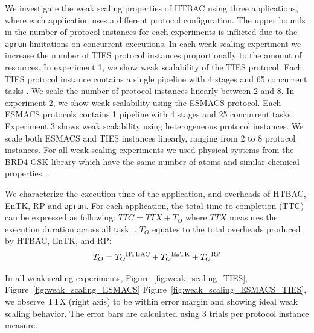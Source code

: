 We investigate the weak scaling properties of HTBAC using three applications,
where each application uses a different protocol configuration. The upper bounds
in the number of protocol instances for each experiments is inflicted due to 
the \texttt{aprun} limitations on concurrent executions. In each weak scaling 
experiment we increase the number of TIES protocol instances proportionally to 
the amount of resources. In experiment 1, we show weak scalability of the TIES 
protocol. Each TIES protocol instance contains a single pipeline with 4 stages 
and 65 concurrent tasks
 . We scale the number of protocol instances linearly 
between 2 and 8. In experiment 2, we show weak scalability using the ESMACS 
protocol. Each ESMACS protocols contains 1 pipeline with 4 stages and 25 
concurrent tasks. Experiment 3 shows weak scalability using heterogeneous 
protocol instances. We scale both ESMACS and TIES instances linearly, ranging 
from 2 to 8 protocol instances. For all weak scaling experiments we used 
physical systems from the BRD4-GSK library which have the same number of atoms
and similar chemical properties. .

We characterize the execution time of the application, and overheads of HTBAC, 
EnTK, RP and \texttt{aprun}.  For each application, the total time to completion 
(TTC)   can 
be expressed as following: $TTC = TTX + T_{O}$ where \(TTX\) measures the 
execution duration across all task.
. 
$T_{O}$ equates to the total overheads produced by HTBAC, EnTK, and 
RP: $$T_{O} = 
T_{O}\textsuperscript{HTBAC} + T_{O}\textsuperscript{EnTK} + 
T_{O}\textsuperscript{RP}$$ 



In all weak scaling experiments, Figure~\ref{fig:weak_scaling_TIES}, 
Figure~\ref{fig:weak_scaling_ESMACS} Figure~\ref{fig:weak_scaling_ESMACS_TIES},
we observe TTX (right axis) to be within error margin and showing ideal weak 
scaling behavior. The error bars are calculated using 3 trials per protocol 
instance measure. 

